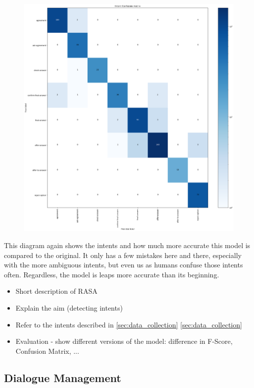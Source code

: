 \documentclass[hidelinks, 11pt]{article}
\begin{document}
\begin{figure}
  \includegraphics[width=\columnwidth]{../Rasa/Evaluation/Clean_Model/intent_confusion_matrix.png}
\end{figure}

This diagram again shows the intents and how much more accurate this model is compared to the original. It only has a few mistakes here and there, especially with the more ambiguous intents, but even us as humans confuse those intents often. Regardless, the model is leaps more accurate than its beginning.

\begin{itemize}
  \item Short description of RASA
  \item Explain the aim (detecting intents)
  \item Refer to the intents described in \ref{sec:data_collection} \cref{sec:data_collection}
  \item Evaluation - show different versions of the model: difference in F-Score, Confusion Matrix, ...
\end{itemize}

\subsection{Dialogue Management}
\label{subsec:dialogue_management}
\end{document}
